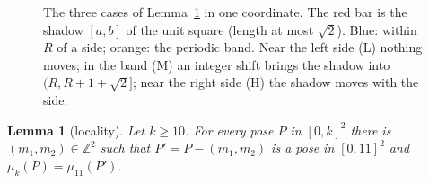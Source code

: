 \documentclass[11pt]{amsart}
\newtheorem{lemma}[theorem]{Lemma}
\theoremstyle{definition}
\theoremstyle{remark}
\newcommand{\Z}{\mathbb Z}
\begin{document}
\begin{figure}[ht]
\centering
\caption{The three cases of Lemma~\ref{lem:local} in one coordinate. The red bar is the shadow $[a,b]$ of the unit
square (length at most $\sqrt2$). Blue: within $R$ of a side; orange: the periodic band. Near the left side (L)
nothing moves; in the band (M) an integer shift brings the shadow into $(R,R+1+\sqrt2]$; near the right side (H) the
shadow moves with the side.}
\label{fig:locality}
\end{figure}

\begin{lemma}[locality]\label{lem:local}
Let $k\ge10$. For every pose $P$ in $[0,k]^2$ there is $(m_1,m_2)\in\Z^2$ such that $P'=P-(m_1,m_2)$ is a pose in
$[0,11]^2$ and $\mu_k(P)=\mu_{11}(P')$.
\end{lemma}
\end{document}
